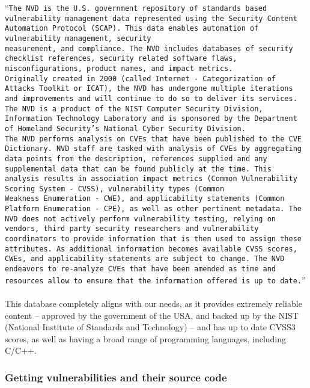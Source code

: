 \enquote{\texttt{The NVD  is the U.S. government repository of standards based vulnerability management data represented using the Security Content Automation Protocol (SCAP). This data enables automation of vulnerability management, security\\ measurement, and compliance. The NVD includes databases of security checklist references, security related software flaws, misconfigurations, product names, and impact metrics.
\\
Originally created in 2000 (called Internet - Categorization of Attacks Toolkit or ICAT), the NVD has undergone multiple iterations and improvements and will continue to do so to deliver its services. The NVD is a product of the NIST Computer Security Division, Information Technology Laboratory and is sponsored by the Department of Homeland Security’s National Cyber Security Division.
\\
The NVD performs analysis on CVEs that have been published to the CVE Dictionary. NVD staff are tasked with analysis of CVEs by aggregating data points from the description, references supplied and any supplemental data that can be found publicly at the time. This analysis results in association impact metrics (Common Vulnerability Scoring System - CVSS), vulnerability types (Common \\Weakness Enumeration - CWE), and applicability statements (Common Platform Enumeration - CPE), as well as other pertinent metadata. The NVD does not actively perform vulnerability testing, relying on vendors, third party security researchers and vulnerability coordinators to provide information that is then used to assign these attributes. As additional information becomes available CVSS scores, CWEs, and applicability statements are subject to change. The NVD endeavors to re-analyze CVEs that have been amended as time and resources allow to ensure that the information offered is up to date.}}\parencite{nvd}
\\\\
This database completely aligns with our needs, as it provides extremely reliable content -- approved by the government of the USA, and backed up by the NIST (National Institute of Standards and Technology) -- and has up to date CVSS3 scores, as well as having a broad range of programming languages, including C/C++. 

\subsubsection{Getting vulnerabilities and their source code}

